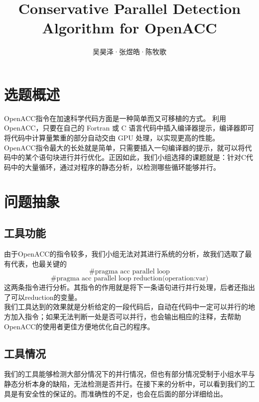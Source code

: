 \documentclass[12pt]{article}
\title{Conservative Parallel Detection Algorithm for OpenACC}
\author{吴昊泽·张煜皓·陈牧歌}
\begin{document}
	\maketitle
	\section{选题概述} 
		OpenACC指令在加速科学代码方面是一种简单而又可移植的方式。 利用 OpenACC，只要在自己的 Fortran 或 C 语言代码中插入编译器提示，编译器即可将代码中计算量繁重的部分自动交由 GPU 处理，以实现更高的性能。\\
		\indent OpenACC指令最大的长处就是简单，只需要插入一句编译器的提示，就可以将代码中的某个语句块进行并行优化。正因如此，我们小组选择的课题就是：针对C代码中的大量循环，通过对程序的静态分析，以检测哪些循环能够并行。\\
	\section{问题抽象}
		\subsection{工具功能}
			由于OpenACC的指令较多，我们小组无法对其进行系统的分析，故我们选取了最有代表，也最关键的\[\text{\#pragma acc parallel loop}\] \[\text{\#pragma acc parallel loop reduction(operation:var)}\]这两条指令进行分析。其指令的作用就是将下一条语句进行并行处理，后者还指出了可以reduction的变量。\\
			\indent 我们工具达到的效果就是分析给定的一段代码后，自动在代码中一定可以并行的地方加入指令；如果无法判断一处是否可以并行，也会输出相应的注释，去帮助OpenACC的使用者更佳方便地优化自己的程序。\\
		\subsection{工具情况}
			我们的工具能够检测大部分情况下的并行情况，但也有部分情况受制于小组水平与静态分析本身的缺陷，无法检测是否并行。在接下来的分析中，可以看到我们的工具是有安全性的保证的。而准确性的不足，也会在后面的部分详细给出。
\end{document}
